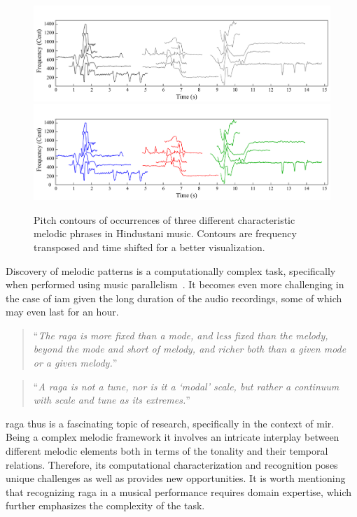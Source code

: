 \begin{figure}
	\begin{center}
		\ifdefined\PRINTVER
			\includegraphics[width=\figSizeHundred]{ch01_introduction/figures/phraseClassesExample_BW.pdf}
		\else
			\includegraphics[width=\figSizeHundred]{ch01_introduction/figures/phraseClassesExample.pdf}
		\fi
	\end{center}
	\caption[Examples of the characteristic melodic phrases in Hindustani Music]{Pitch contours of occurrences of three different characteristic melodic phrases in Hindustani music. Contours are frequency transposed and time shifted for a better visualization.}
	\label{fig:phraseComplexityExample_intro}
\end{figure}

Discovery of melodic patterns is a computationally complex task, specifically when performed using music parallelism~\citep{Cambouropoulos2006}. It becomes even more challenging in the case of \gls{iam} given the long duration of the audio recordings, some of which may even last for an hour.

\blockcquote[p. 96]{martinez2001semiosis}{``\textit{The \gls{raga} is more fixed than a mode, and less fixed than the melody, beyond the mode and short of melody, and richer both than a given mode or a given melody.}''}


\blockcquote[]{powers1963background}{``\textit{A \gls{raga} is not a tune, nor is it a `modal' scale, but rather a continuum with scale and tune as its extremes.}''}

\Gls{raga} thus is a fascinating topic of research, specifically in the context of \gls{mir}. Being a complex melodic framework it involves an intricate interplay between different melodic elements both in terms of the tonality and their temporal relations. Therefore, its computational characterization and recognition poses unique challenges as well as provides new opportunities. It is worth mentioning that recognizing \gls{raga} in a musical performance requires domain expertise, which further emphasizes the complexity of the task.

